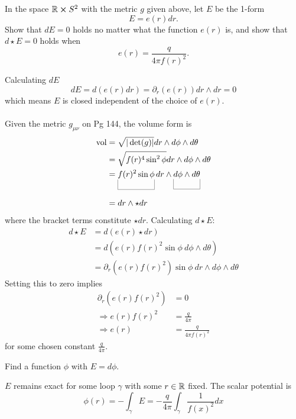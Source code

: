 \documentclass[10pt]{article}
\begin{document}
\begin{example}\label{b1e104}
	In the space $\mathbb{R} \cross S^2$ with the metric $g$ given above, let $E$ be the 1-form
	$$
		E = e(r)dr.
	$$
	Show that $dE=0$ holds no matter what the function $e(r)$ is, and show that $d\star E=0$ holds when
	$$
		e(r)=\frac{q}{4\pi f(r)^2}.
	$$
\end{example}
\sol Calculating $dE$
$$
dE = d(e(r)dr) = \partial_r(e(r)) dr \wedge dr = 0
$$
which means $E$ is closed independent of the choice of $e(r)$.\\\\
Given the metric $g_{\mu\nu}$ on Pg 144, the volume form is
$$
\begin{aligned}
	\vol &= \sqrt{|\det (g)|} dr \wedge d\phi \wedge d\theta\\
	&= \sqrt{f(r)^4 \sin^2\phi} dr \wedge d\phi \wedge d\theta\\
	&= \ub{f(r)^2 \sin\phi}{} dr \wedge \ub{d\phi \wedge d\theta}{}\\
	&= dr \wedge \star dr
\end{aligned}
$$
where the bracket terms constitute $\star dr$. Calculating $d\star E$:
$$
\begin{aligned}
	d\star E &= d(e(r) \star dr)\\
	&= d(e(r) f(r)^2 \sin\phi\:d\phi \wedge d\theta)\\
	&= \partial_r(e(r) f(r)^2) \sin\phi\:dr \wedge d\phi \wedge d\theta
\end{aligned}
$$
Setting this to zero implies
$$
\begin{aligned}
	\partial_r(e(r) f(r)^2) &= 0\\
	\Rightarrow e(r) f(r)^2 &= \frac{q}{4\pi}\\
	\Rightarrow e(r) &= \frac{q}{4\pi f(r)^2}
\end{aligned}
$$
for some chosen constant $\frac{q}{4\pi}$.


\begin{example}
	Find a function $\phi$ with $E=d\phi$.
\end{example}
\sol $E$ remains exact for some loop $\gamma$ with some $r \in \mathbb{R}$ fixed. The scalar potential is
$$
\phi(r) = -\int_\gamma E = -\frac{q}{4\pi} \int_\gamma \frac{1}{f(x)^2} dx
$$
\end{document}
